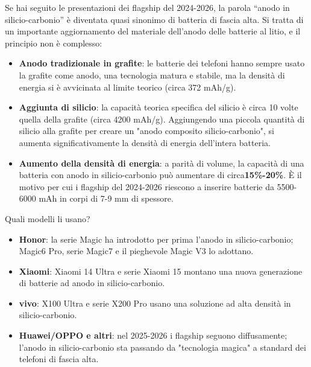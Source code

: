 
Se hai seguito le presentazioni dei flagship del 2024-2026, la parola “anodo in silicio-carbonio” è diventata quasi sinonimo di batteria di fascia alta. Si tratta di un importante aggiornamento del materiale dell'anodo delle batterie al litio, e il principio non è complesso:

\begin{itemize}
  \item \textbf{Anodo tradizionale in grafite}: le batterie dei telefoni hanno sempre usato la grafite come anodo, una tecnologia matura e stabile, ma la densità di energia si è avvicinata al limite teorico (circa 372 mAh/g).
  \item \textbf{Aggiunta di silicio}: la capacità teorica specifica del silicio è circa 10 volte quella della grafite (circa 4200 mAh/g). Aggiungendo una piccola quantità di silicio alla grafite per creare un "anodo composito silicio-carbonio", si aumenta significativamente la densità di energia dell'intera batteria.
  \item \textbf{Aumento della densità di energia}: a parità di volume, la capacità di una batteria con anodo in silicio-carbonio può aumentare di circa\textbf{15\%-20\%}. È il motivo per cui i flagship del 2024-2026 riescono a inserire batterie da 5500-6000 mAh in corpi di 7-9 mm di spessore.
\end{itemize}

\begin{tcbinfo}{Quali modelli li usano?}
\begin{itemize}
  \item \textbf{Honor}: la serie Magic ha introdotto per prima l'anodo in silicio-carbonio; Magic6 Pro, serie Magic7 e il pieghevole Magic V3 lo adottano.
  \item \textbf{Xiaomi}: Xiaomi 14 Ultra e serie Xiaomi 15 montano una nuova generazione di batterie ad anodo in silicio-carbonio.
  \item \textbf{vivo}: X100 Ultra e serie X200 Pro usano una soluzione ad alta densità in silicio-carbonio.
  \item \textbf{Huawei/OPPO e altri}: nel 2025-2026 i flagship seguono diffusamente; l'anodo in silicio-carbonio sta passando da "tecnologia magica" a standard dei telefoni di fascia alta.
\end{itemize}

\end{tcbinfo}

